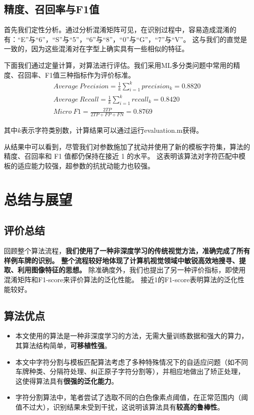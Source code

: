 \documentclass[utf8,a4paper]{ctexart}
\begin{document}
\subsection{精度、召回率与F1值}
首先我们定性分析。通过分析混淆矩阵可见，在识别过程中，容易造成混淆的有：``E''与``6''，``S''与``5''，``6''与``8''，``0''与``G''，``7''与``V''。
这与我们的直觉是一致的，因为这些混淆对在字型上确实具有一些相似的特征。

下面我们通过定量计算，对算法进行评估。我们采用ML多分类问题中常用的精度、召回率、F1值三种指标作为评价标准。
\begin{equation}
    \begin{aligned}
        Average\ Precision = \frac{1}{k}\sum_{i=1}^{k}precision_k=0.8820\\
        Average\ Recall = \frac{1}{k}\sum_{i=1}^{k}recall_k=0.8420\\
        Micro\ F1 = \frac{2TP}{2TP+FP+FN} = 0.8769
    \end{aligned}
\end{equation}

其中$k$表示字符类别数，计算结果可以通过运行evaluation.m获得。

从结果中可以看到，尽管我们对参数施加了扰动并使用了新的模板字符集，算法的精度、召回率和 F1 值都仍保持在接近 1 的水平。
这表明该算法对字符匹配中模板的适应能力较强，超参数的抗扰动能力也较强。

\section{总结与展望}
\subsection{评价总结}
回顾整个算法流程，\textbf{我们使用了一种非深度学习的传统视觉方法，准确完成了所有样例车牌的识别。
整个流程较好地体现了计算机视觉领域中敏锐高效地搜寻、提取、利用图像特征的思想。}
除准确度外，我们也提出了另一种评价指标，即使用混淆矩阵和F1-score来评价算法的泛化性能。
接近1的F1-score表明算法的泛化性能较好。

\subsection{算法优点}
\begin{itemize}
    \item 本文使用的算法是一种非深度学习的方法，无需大量训练数据和强大的算力，其算法结构简单，\textbf{可移植性强}。
    \item 本文中字符分割与模板匹配算法考虑了多种特殊情况下的自适应问题（如不同车牌种类、分隔符处理、纠正原子字符分割等），并相应地做出了矫正处理，这使得算法具有\textbf{很强的泛化能力}。
    \item 字符分割算法中，笔者尝试了选取不同的白色像素点阈值，在正常范围内（阈值不过大），识别结果未受到干扰，这说明该算法具有\textbf{较高的鲁棒性}。
\end{itemize}
\end{document}
